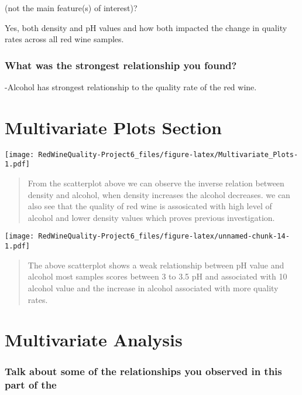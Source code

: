 \documentclass[]{article}
\begin{document}
(not the main feature(s) of interest)?

Yes, both density and pH values and how both impacted the change in
quality rates across all red wine samples.

\hypertarget{what-was-the-strongest-relationship-you-found}{%
\subsubsection{What was the strongest relationship you
found?}\label{what-was-the-strongest-relationship-you-found}}

-Alcohol has strongest relationship to the quality rate of the red wine.

\hypertarget{multivariate-plots-section}{%
\section{Multivariate Plots Section}\label{multivariate-plots-section}}

\texttt{[image: RedWineQuality-Project6\_files/figure-latex/Multivariate\_Plots-1.pdf]}

\begin{quote}
From the scatterplot above we can observe the inverse relation between
density and alcohol, when density increases the alcohol decreases. we
can also see that the quality of red wine is assosicated with high level
of alcohol and lower density values which proves previous investigation.
\end{quote}

\texttt{[image: RedWineQuality-Project6\_files/figure-latex/unnamed-chunk-14-1.pdf]}

\begin{quote}
The above scatterplot shows a weak relationship between pH value and
alcohol most samples scores between 3 to 3.5 pH and associated with 10
alcohol value and the increase in alcohol associated with more quality
rates.
\end{quote}

\hypertarget{multivariate-analysis}{%
\section{Multivariate Analysis}\label{multivariate-analysis}}

\hypertarget{talk-about-some-of-the-relationships-you-observed-in-this-part-of-the-1}{%
\subsubsection{\texorpdfstring{Talk about some of the relationships you
observed in this part of the\\
}{Talk about some of the relationships you observed in this part of the }}\label{talk-about-some-of-the-relationships-you-observed-in-this-part-of-the-1}}
\end{document}
